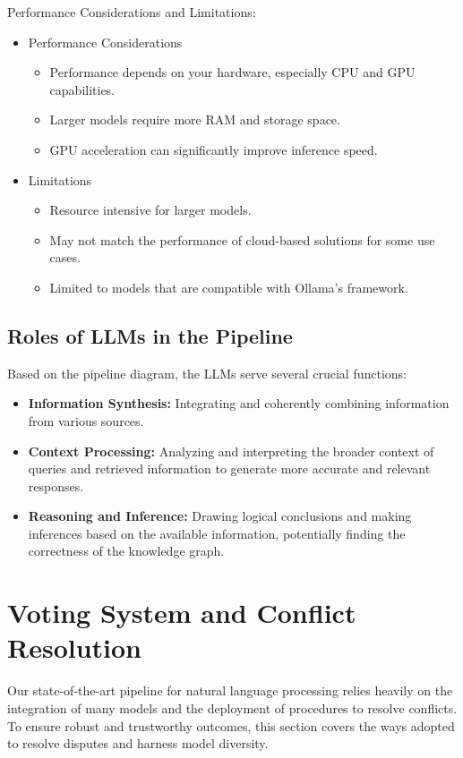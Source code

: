 Performance Considerations and Limitations:
\begin{itemize}
    \item Performance Considerations
    \begin{itemize}
        \item Performance depends on your hardware, especially CPU and GPU capabilities.
        \item Larger models require more RAM and storage space.
        \item GPU acceleration can significantly improve inference speed.
    \end{itemize}
    \item Limitations
    \begin{itemize}
        \item Resource intensive for larger models.
        \item May not match the performance of cloud-based solutions for some use cases.
        \item Limited to models that are compatible with Ollama's framework.
    \end{itemize}
\end{itemize}

\subsection{Roles of LLMs in the Pipeline}\label{subsec:roles-of-llms-in-the-pipeline}
Based on the pipeline diagram, the LLMs serve several crucial functions:
\begin{itemize}
    \item \textbf{Information Synthesis:} Integrating and coherently combining information from various sources.
    \item \textbf{Context Processing:} Analyzing and interpreting the broader context of queries and retrieved information to generate more accurate and relevant responses.
    \item \textbf{Reasoning and Inference:} Drawing logical conclusions and making inferences based on the available information, potentially finding the correctness of the knowledge graph.
\end{itemize}


\section{Voting System and Conflict Resolution}\label{sec:model-diversity-and-conflict-resolution}
Our state-of-the-art pipeline for natural language processing relies heavily on the integration of many models and the deployment of procedures to resolve conflicts.
To ensure robust and trustworthy outcomes, this section covers the ways adopted to resolve disputes and harness model diversity.

